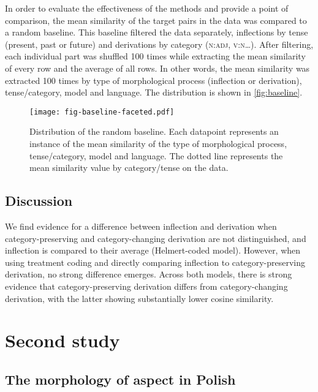 \documentclass[12pt]{article}
\begin{document}
In order to evaluate the effectiveness of the methods and provide a point of comparison, the mean similarity of the target pairs in the data was compared to a random baseline. This baseline filtered the data separately, inflections by tense (present, past or future) and derivations by category (\textsc{n:adj}, \textsc{v:n}\dots). After filtering, each individual part was shuffled 100 times while extracting the mean similarity of every row and the average of all rows. In other words, the mean similarity was extracted 100 times by type of morphological process (inflection or derivation), tense/category, model and language. The distribution is shown in \autoref{fig:baseline}.

\begin{figure}[!htbp]
\centering
\texttt{[image: fig-baseline-faceted.pdf]}
\caption{Distribution of the random baseline. Each datapoint represents an instance of the mean similarity of the type of morphological process, tense/category, model and language. The dotted line represents the mean similarity value by category/tense on the data.}
\label{fig:baseline}
\end{figure}

\subsection{Discussion} \label{discussion1}


We find evidence for a difference between inflection and derivation when category-preserving and category-changing derivation are not distinguished, and inflection is compared to their average (Helmert-coded model). However, when using treatment coding and directly comparing inflection to category-preserving derivation, no strong difference emerges. Across both models, there is strong evidence that category-preserving derivation differs from category-changing derivation, with the latter showing substantially lower cosine similarity.

\newpage
\section{Second study} \label{second}

\subsection{The morphology of aspect in Polish} \label{polishaspect}
\end{document}
